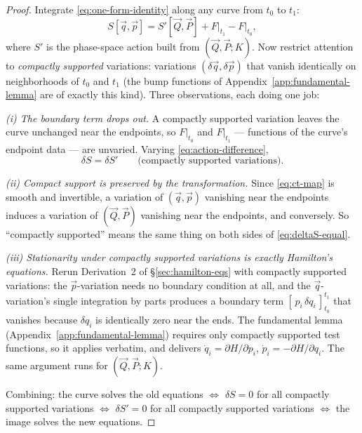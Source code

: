 \documentclass[11pt]{article}
\theoremstyle{plain}
\theoremstyle{definition}
\theoremstyle{remark}
\newcommand{\vq}{\vec{q}}
\newcommand{\vp}{\vec{p}}
\newcommand{\vQ}{\vec{Q}}
\newcommand{\vP}{\vec{P}}
\begin{document}
\begin{proof}
Integrate \eqref{eq:one-form-identity} along any curve from $t_0$ to
$t_1$:
\begin{equation}
  S[\vq, \vp]
  = S'[\vQ, \vP] + F\big|_{t_1} - F\big|_{t_0},
  \label{eq:action-difference}
\end{equation}
where $S'$ is the phase-space action built from $(\vQ, \vP; K)$. Now
restrict attention to \emph{compactly supported} variations: variations
$(\delta\vq, \delta\vp)$ that vanish identically on neighborhoods of
$t_0$ and $t_1$ (the bump functions of
Appendix~\ref{app:fundamental-lemma} are of exactly this kind). Three
observations, each doing one job:

\emph{(i) The boundary term drops out.} A compactly supported variation
leaves the curve unchanged near the endpoints, so $F|_{t_0}$ and
$F|_{t_1}$ --- functions of the curve's endpoint data --- are unvaried.
Varying \eqref{eq:action-difference},
\begin{equation}
  \delta S = \delta S'
  \qquad \text{(compactly supported variations)} .
  \label{eq:deltaS-equal}
\end{equation}

\emph{(ii) Compact support is preserved by the transformation.} Since
\eqref{eq:ct-map} is smooth and invertible, a variation of
$(\vq, \vp)$ vanishing near the endpoints induces a variation of
$(\vQ, \vP)$ vanishing near the endpoints, and conversely. So
``compactly supported'' means the same thing on both sides of
\eqref{eq:deltaS-equal}.

\emph{(iii) Stationarity under compactly supported variations is
exactly Hamilton's equations.} Rerun Derivation~2 of
\S\ref{sec:hamilton-eqs} with compactly supported variations: the
$\vp$-variation needs no boundary condition at all, and the
$\vq$-variation's single integration by parts produces a boundary term
$[\,p_i\,\delta q_i\,]_{t_0}^{t_1}$ that vanishes because
$\delta q_i$ is identically zero near the ends. The fundamental lemma
(Appendix~\ref{app:fundamental-lemma}) requires only compactly
supported test functions, so it applies verbatim, and delivers
$\dot q_i = \partial H/\partial p_i$,
$\dot p_i = -\partial H/\partial q_i$. The same argument runs for
$(\vQ, \vP; K)$.

Combining: the curve solves the old equations $\iff$
$\delta S = 0$ for all compactly supported variations $\iff$
$\delta S' = 0$ for all compactly supported variations $\iff$
the image solves the new equations.
\end{proof}
\end{document}
